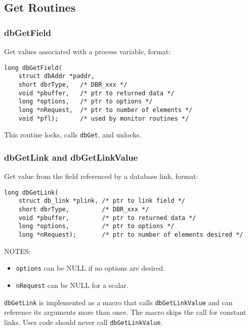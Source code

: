 \subsection{Get Routines}

\subsubsection{dbGetField}

Get values associated with a process variable, format:

\begin{verbatim}
long dbGetField(
    struct dbAddr *paddr,
    short dbrType,   /* DBR_xxx */
    void *pbuffer,   /* ptr to returned data */
    long *options,   /* ptr to options */
    long *nRequest,  /* ptr to number of elements */
    void *pfl);      /* used by monitor routines */
\end{verbatim}

This routine locks, calls \verb|dbGet|, and unlocks.

\subsubsection{dbGetLink and dbGetLinkValue}

Get value from the field referenced by a database link, format:

\begin{verbatim}
long dbGetLink(
    struct db_link *plink, /* ptr to link field */
    short dbrType,         /* DBR_xxx */
    void *pbuffer,         /* ptr to returned data */
    long *options,         /* ptr to options */
    long *nRequest);       /* ptr to number of elements desired */
\end{verbatim}

NOTES:

\begin{itemize}

\item \verb|options| can be NULL if no options are desired.

\item \verb|nRequest| can be NULL for a scalar.

\end{itemize}

\verb|dbGetLink| is implemented as a macro that calls \verb|dbGetLinkValue| and can reference its arguments more than once.
The macro skips the call for constant links.
User code should never call \verb|dbGetLinkValue|.

